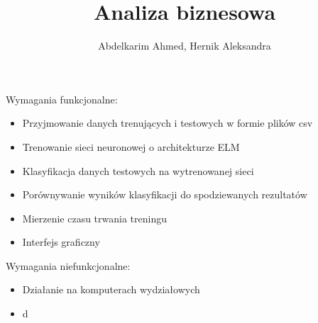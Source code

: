 \documentclass{article}
\title{Analiza biznesowa}
\author{Abdelkarim Ahmed, Hernik Aleksandra}
\begin{document}
\maketitle
\noindent
Wymagania funkcjonalne:
\begin{itemize}
\item Przyjmowanie danych trenujących i testowych w formie plików csv
\item Trenowanie sieci neuronowej o architekturze ELM
\item Klasyfikacja danych testowych na wytrenowanej sieci
\item Porównywanie wyników klasyfikacji do spodziewanych rezultatów
\item Mierzenie czasu trwania treningu
\item Interfejs graficzny
\end{itemize}
Wymagania niefunkcjonalne:
\begin{itemize}
\item Działanie na komputerach wydziałowych
\item d
\end{itemize}
\end{document}
